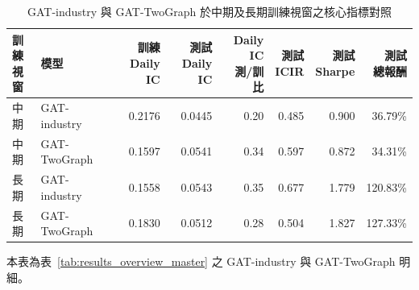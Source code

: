\begin{table}[H]
\centering
\caption{GAT-industry 與 GAT-TwoGraph 於中期及長期訓練視窗之核心指標對照}
\label{tab:results_twograph_detail}
\begingroup
\scriptsize
\setlength{\tabcolsep}{4pt}
\renewcommand{\arraystretch}{1.10}
\begin{adjustbox}{max width=\textwidth}
\begin{tabular}{@{}llrrrrrr@{}}
\toprule
\makecell[l]{訓練\\視窗} & 模型 & \makecell[r]{訓練\\Daily IC} & \makecell[r]{測試\\Daily IC} & \makecell[r]{Daily IC\\測/訓比} & \makecell[r]{測試\\ICIR} & \makecell[r]{測試\\Sharpe} & \makecell[r]{測試\\總報酬} \\
\midrule
中期 & GAT-industry & 0.2176 & 0.0445 & 0.20 & 0.485 & 0.900 & 36.79\% \\
中期 & GAT-TwoGraph & 0.1597 & 0.0541 & 0.34 & 0.597 & 0.872 & 34.31\% \\
\midrule
長期 & GAT-industry & 0.1558 & 0.0543 & 0.35 & 0.677 & 1.779 & 120.83\% \\
長期 & GAT-TwoGraph & 0.1830 & 0.0512 & 0.28 & 0.504 & 1.827 & 127.33\% \\
\bottomrule
\end{tabular}
\end{adjustbox}
\smallskip

{\footnotesize 本表為表~\ref{tab:results_overview_master} 之 GAT-industry 與 GAT-TwoGraph 明細。}
\endgroup
\end{table}
